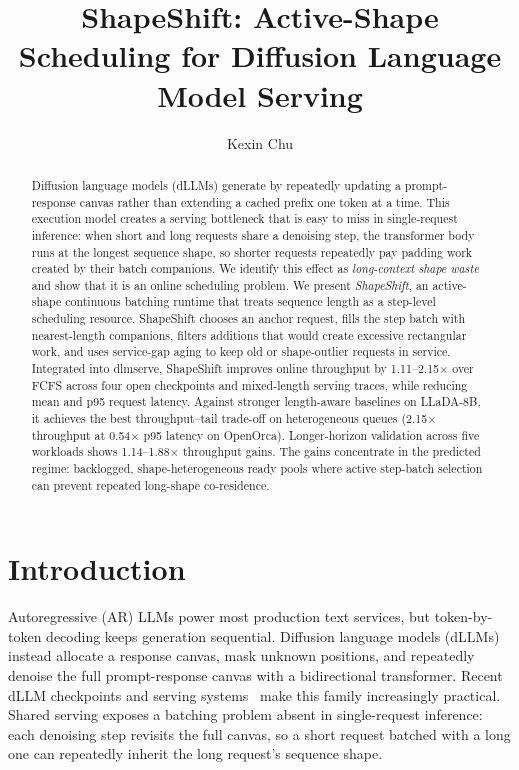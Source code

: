 \documentclass[a4paper]{llncs}
\title{ShapeShift: Active-Shape Scheduling for Diffusion Language Model Serving}
\author{Kexin Chu}
\institute{University of Connecticut\\ \email{kexin.chu@uconn.edu}}
\begin{document}
\maketitle

\begin{abstract}
Diffusion language models (dLLMs) generate by repeatedly updating a prompt-response canvas rather than extending a cached prefix one token at a time. This execution model creates a serving bottleneck that is easy to miss in single-request inference: when short and long requests share a denoising step, the transformer body runs at the longest sequence shape, so shorter requests repeatedly pay padding work created by their batch companions. We identify this effect as \emph{long-context shape waste} and show that it is an online scheduling problem. We present \emph{ShapeShift}, an active-shape continuous batching runtime that treats sequence length as a step-level scheduling resource. ShapeShift chooses an anchor request, fills the step batch with nearest-length companions, filters additions that would create excessive rectangular work, and uses service-gap aging to keep old or shape-outlier requests in service. Integrated into dlmserve, ShapeShift improves online throughput by 1.11--2.15$\times$ over FCFS across four open checkpoints and mixed-length serving traces, while reducing mean and p95 request latency. Against stronger length-aware baselines on LLaDA-8B, it achieves the best throughput--tail trade-off on heterogeneous queues (2.15$\times$ throughput at 0.54$\times$ p95 latency on OpenOrca). Longer-horizon validation across five workloads shows 1.14--1.88$\times$ throughput gains. The gains concentrate in the predicted regime: backlogged, shape-heterogeneous ready pools where active step-batch selection can prevent repeated long-shape co-residence.
\end{abstract}

\section{Introduction}

Autoregressive (AR) LLMs power most production text services, but token-by-token decoding keeps generation sequential. Diffusion language models (dLLMs) instead allocate a response canvas, mask unknown positions, and repeatedly denoise the full prompt-response canvas with a bidirectional transformer. Recent dLLM checkpoints and serving systems~\cite{ssdlm2022,diffullama2024,nie2025llada,dream2025,coda2025,llada20_2025,illada2026,zhao2025fastdllm,dInfer2025,dllmserve2025} make this family increasingly practical. Shared serving exposes a batching problem absent in single-request inference: each denoising step revisits the full canvas, so a short request batched with a long one can repeatedly inherit the long request's sequence shape.
\end{document}
